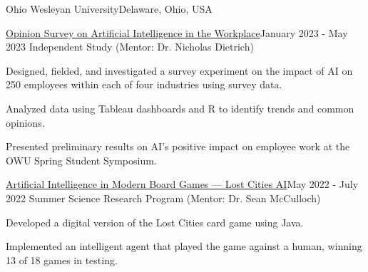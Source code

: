 \documentclass[10pt, letterpaper]{article}
\begin{document}
\begin{leadershipentry}{Ohio Wesleyan University}{Delaware, Ohio, USA}
	\begin{researchentry}{\href{https://github.com/agopalareddy/ai-opinion-survey}{Opinion Survey on Artificial Intelligence in the Workplace}}{January 2023 - May 2023}
		Independent Study (Mentor: Dr. Nicholas Dietrich)
		\begin{highlightsforbulletentries}
		\item Designed, fielded, and investigated a survey experiment on the impact of AI on 250 employees within each of four industries using survey data.
		\item Analyzed data using Tableau dashboards and R to identify trends and common opinions.
		\item Presented preliminary results on AI's positive impact on employee work at the OWU Spring Student Symposium.
		\end{highlightsforbulletentries}
	\end{researchentry}
	\begin{researchentry}{\href{https://agreddy.com/lost-cities/}{Artificial Intelligence in Modern Board Games --- Lost Cities AI}}{May 2022 - July 2022}
		Summer Science Research Program (Mentor: Dr. Sean McCulloch)
		\begin{highlightsforbulletentries}
		\item Developed a digital version of the Lost Cities card game using Java.
		\item Implemented an intelligent agent that played the game against a human, winning 13 of 18 games in testing.
		\end{highlightsforbulletentries}
	\end{researchentry}
\end{leadershipentry}

\vspace{\headerSpacing}

\section{}
\end{document}
